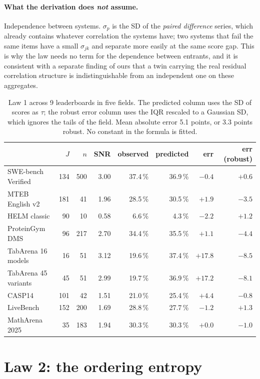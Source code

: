 \documentclass[10pt]{article}
\begin{document}
\paragraph{What the derivation does \emph{not} assume.} Independence between
systems. $\sigma_p$ is the SD of the \emph{paired difference} series, which
already contains whatever correlation the systems have; two systems that
fail the same items have a small $\sigma_{jk}$ and separate more easily at
the same score gap. This is why the law needs no term for the dependence
between entrants, and it is consistent with a separate finding of ours that
a twin carrying the real residual correlation structure is
indistinguishable from an independent one on these aggregates.

\begin{table}[t]\centering\small
\begin{tabular}{l rr r rr rr}
\toprule
 & $J$ & $n$ & SNR & observed & predicted & err & err (robust) \\
\midrule
SWE-bench Verified & 134 & 500 & 3.00 & 37.4\,\% & 36.9\,\% & $-0.4$ & $+0.6$ \\
MTEB English v2 & 181 & 41 & 1.96 & 28.5\,\% & 30.5\,\% & $+1.9$ & $-3.5$ \\
HELM classic & 90 & 10 & 0.58 & 6.6\,\% & 4.3\,\% & $-2.2$ & $+1.2$ \\
ProteinGym DMS & 96 & 217 & 2.70 & 34.4\,\% & 35.5\,\% & $+1.1$ & $-4.4$ \\
TabArena 16 models & 16 & 51 & 3.12 & 19.6\,\% & 37.4\,\% & $+17.8$ & $-8.5$ \\
TabArena 45 variants & 45 & 51 & 2.99 & 19.7\,\% & 36.9\,\% & $+17.2$ & $-8.1$ \\
CASP14 & 101 & 42 & 1.51 & 21.0\,\% & 25.4\,\% & $+4.4$ & $-0.8$ \\
LiveBench & 152 & 200 & 1.69 & 28.8\,\% & 27.7\,\% & $-1.2$ & $+1.3$ \\
MathArena 2025 & 35 & 183 & 1.94 & 30.3\,\% & 30.3\,\% & $+0.0$ & $-1.0$ \\
\bottomrule
\end{tabular}
\caption{Law 1 across 9 leaderboards in five fields. The predicted column uses the SD of scores as $\tau$; the robust error column uses the IQR rescaled to a Gaussian SD, which ignores the tails of the field. Mean absolute error 5.1 points, or 3.3 points robust. No constant in the formula is fitted.}
\label{tab:law1}
\end{table}

\section{Law 2: the ordering entropy}
\end{document}
